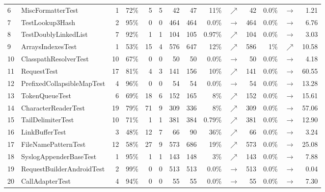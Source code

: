 \begin{table}
\begin{tabular}{|llrrrr|rrrr|rrr|r|}
		\rowcolor[HTML]{EFEFEF}
		6&\scriptsize{MiscFormatterTest}&1&72\%&5&5&42&47&11\%&{\color{ForestGreen}$\nearrow$}&42&0.0\%&$\rightarrow$&1.21 \\
		7&\scriptsize{TestLookup3Hash}&2&95\%&0&0&464&464&0.0\%&$\rightarrow$&464&0.0\%&$\rightarrow$&6.76 \\
		\rowcolor[HTML]{EFEFEF}
		8&\scriptsize{TestDoublyLinkedList}&7&92\%&1&1&104&105&0.97\%&{\color{ForestGreen}$\nearrow$}&104&0.0\%&$\rightarrow$&3.03 \\
		9&\scriptsize{ArraysIndexesTest}&1&53\%&15&4&576&647&12\%&{\color{ForestGreen}$\nearrow$}&586&1\%&{\color{ForestGreen}$\nearrow$}&10.58 \\
		\rowcolor[HTML]{EFEFEF}
		10&\scriptsize{ClasspathResolverTest}&10&67\%&0&0&50&50&0.0\%&$\rightarrow$&50&0.0\%&$\rightarrow$&4.18 \\
		11&\scriptsize{RequestTest}&17&81\%&4&3&141&156&10\%&{\color{ForestGreen}$\nearrow$}&141&0.0\%&$\rightarrow$&60.55 \\
		\rowcolor[HTML]{EFEFEF}
		12&\scriptsize{PrefixedCollapsibleMapTest}&4&96\%&0&0&54&54&0.0\%&$\rightarrow$&54&0.0\%&$\rightarrow$&13.28 \\
		13&\scriptsize{TokenQueueTest}&6&69\%&18&6&152&165&8\%&{\color{ForestGreen}$\nearrow$}&152&0.0\%&$\rightarrow$&15.61 \\
		\rowcolor[HTML]{EFEFEF}
		14&\scriptsize{CharacterReaderTest}&19&79\%&71&9&309&336&8\%&{\color{ForestGreen}$\nearrow$}&309&0.0\%&$\rightarrow$&57.06 \\
		15&\scriptsize{TailDelimiterTest}&10&71\%&1&1&381&384&0.79\%&{\color{ForestGreen}$\nearrow$}&381&0.0\%&$\rightarrow$&12.90 \\
		\rowcolor[HTML]{EFEFEF}
		16&\scriptsize{LinkBufferTest}&3&48\%&12&7&66&90&36\%&{\color{ForestGreen}$\nearrow$}&66&0.0\%&$\rightarrow$&3.24 \\
		17&\scriptsize{FileNamePatternTest}&12&58\%&27&9&573&686&19\%&{\color{ForestGreen}$\nearrow$}&573&0.0\%&$\rightarrow$&25.08 \\
		\rowcolor[HTML]{EFEFEF}
		18&\scriptsize{SyslogAppenderBaseTest}&1&95\%&1&1&143&148&3\%&{\color{ForestGreen}$\nearrow$}&143&0.0\%&$\rightarrow$&7.88 \\
		19&\scriptsize{RequestBuilderAndroidTest}&2&99\%&0&0&513&513&0.0\%&$\rightarrow$&513&0.0\%&$\rightarrow$&0.04 \\
		\rowcolor[HTML]{EFEFEF}
		20&\scriptsize{CallAdapterTest}&4&94\%&0&0&55&55&0.0\%&$\rightarrow$&55&0.0\%&$\rightarrow$&7.30 \\

\end{tabular}
\end{table}
